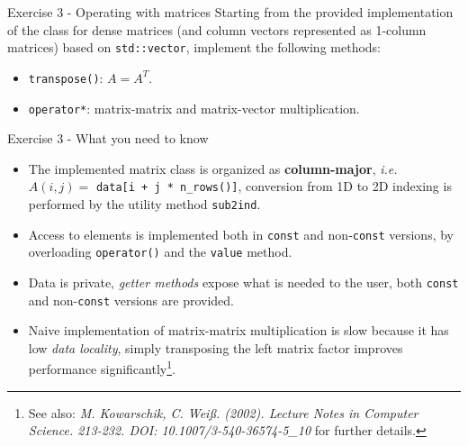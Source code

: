 \documentclass[10pt,aspectratio=169]{beamer}
\begin{document}
\begin{frame}{Exercise 3 - Operating with matrices}
Starting from the provided implementation of the class for dense matrices (and column vectors represented as 1-column matrices) based on \lstinline{std::vector}, implement the following methods:
\begin{itemize}
\item \lstinline{transpose()}: $A = A^{T}$.
\item \lstinline{operator*}: matrix-matrix and matrix-vector multiplication.
\end{itemize}
\end{frame}

\begin{frame}{Exercise 3 - What you need to know}
\begin{itemize}
\item The implemented matrix class is organized as
      \textbf{column-major}, \textit{i.e.}
      $A(i, j) = $ \lstinline{data[i + j * n_rows()]},
      conversion from 1D to 2D indexing is performed by the utility
      method \lstinline{sub2ind}.\\[3mm]
\item Access to elements is implemented both in \texttt{const} and non-\texttt{const} versions, by overloading \lstinline{operator()} and the \texttt{value} method. \\[3mm]
\item Data is private, \textit{getter methods} expose what is needed to the user, both \texttt{const} and non-\texttt{const} versions are provided. \\[3mm]
\item Naive implementation of matrix-matrix multiplication is slow because it has low \textit{data locality}, simply transposing the left matrix factor improves performance significantly\footnote{See also: \textit{M. Kowarschik, C. Weiß. (2002). Lecture Notes in Computer Science. 213-232. DOI: 10.1007/3-540-36574-5\_10} for further details.}.\\[3mm]
\end{itemize}
\end{frame}
\end{document}

